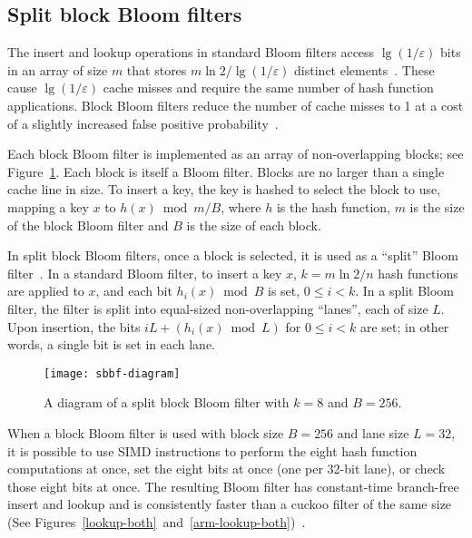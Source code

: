 \documentclass[letterpaper,twocolumn,10pt]{article}
\newcommand{\etal}{et al.}
\begin{document}
\subsection{Split block Bloom filters}



The insert and lookup operations in standard Bloom filters access $\lg (1/\varepsilon)$ bits in an array of size $m$ that stores $m \ln 2 / \lg(1/\varepsilon)$ distinct elements~\cite{bloom-original}.
These cause $\lg (1/\varepsilon)$ cache misses and require the same number of hash function applications.
Block Bloom filters reduce the number of cache misses to 1 at a cost of a slightly increased false positive probability~\cite{block-bloom}.

Each block Bloom filter is implemented as an array of non-overlapping blocks; see Figure~\ref{sbbf-diagram}.
Each block is itself a Bloom filter.
Blocks are no larger than a single cache line in size.
To insert a key, the key is hashed to select the block to use, mapping a key $x$ to $h(x) \bmod m/B$, where $h$ is the hash function, $m$ is the size of the block Bloom filter and $B$ is the size of each block.

In split block Bloom filters, once a block is selected, it is used as a ``split'' Bloom filter~\cite{split-bloom}.
In a standard Bloom filter, to insert a key $x$, $k = m \ln 2 / n$ hash functions are applied to $x$, and each bit $h_i(x) \bmod B$ is set, $0 \le i < k$.
In a split Bloom filter, the filter is split into equal-sized non-overlapping ``lanes'', each of size $L$.
Upon insertion, the bits $i L + (h_i(x) \bmod L)$ for $0 \le i < k$ are set; in other words, a single bit is set in each lane.

\begin{figure}[b!]
  \texttt{[image: sbbf-diagram]}
\caption{\label{sbbf-diagram}
A diagram of a split block Bloom filter with $k = 8$ and $B = 256$.
}
\end{figure}

When a block Bloom filter is used with block size $B = 256$ and lane size $L = 32$, it is possible to use SIMD instructions to perform the eight hash function computations at once, set the eight bits at once (one per 32-bit lane), or check those eight bits at once.
The resulting Bloom filter has constant-time branch-free insert and lookup and is consistently faster than a cuckoo filter of the same size (See Figures~\ref{lookup-both}~and~\ref{arm-lookup-both})~\cite{cuckoo-filter-github,ultra-fast,overtakes,impala-bloom}.
\end{document}
